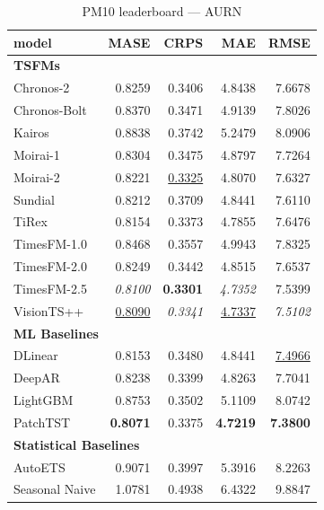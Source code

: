 \begin{table}[H]
\caption{PM10 leaderboard --- AURN}
\centering
\begin{small}
\begin{tabular}{lrrrr}
\toprule
model & MASE & CRPS & MAE & RMSE \\
\midrule
\multicolumn{5}{l}{\textbf{TSFMs}} \\
Chronos-2 & 0.8259 & 0.3406 & 4.8438 & 7.6678 \\
Chronos-Bolt & 0.8370 & 0.3471 & 4.9139 & 7.8026 \\
Kairos & 0.8838 & 0.3742 & 5.2479 & 8.0906 \\
Moirai-1 & 0.8304 & 0.3475 & 4.8797 & 7.7264 \\
Moirai-2 & 0.8221 & \underline{0.3325} & 4.8070 & 7.6327 \\
Sundial & 0.8212 & 0.3709 & 4.8441 & 7.6110 \\
TiRex & 0.8154 & 0.3373 & 4.7855 & 7.6476 \\
TimesFM-1.0 & 0.8468 & 0.3557 & 4.9943 & 7.8325 \\
TimesFM-2.0 & 0.8249 & 0.3442 & 4.8515 & 7.6537 \\
TimesFM-2.5 & \textit{0.8100} & \textbf{0.3301} & \textit{4.7352} & 7.5399 \\
VisionTS++ & \underline{0.8090} & \textit{0.3341} & \underline{4.7337} & \textit{7.5102} \\
\midrule
\multicolumn{5}{l}{\textbf{ML Baselines}} \\
DLinear & 0.8153 & 0.3480 & 4.8441 & \underline{7.4966} \\
DeepAR & 0.8238 & 0.3399 & 4.8263 & 7.7041 \\
LightGBM & 0.8753 & 0.3502 & 5.1109 & 8.0742 \\
PatchTST & \textbf{0.8071} & 0.3375 & \textbf{4.7219} & \textbf{7.3800} \\
\midrule
\multicolumn{5}{l}{\textbf{Statistical Baselines}} \\
AutoETS & 0.9071 & 0.3997 & 5.3916 & 8.2263 \\
Seasonal Naive & 1.0781 & 0.4938 & 6.4322 & 9.8847 \\
\bottomrule
\end{tabular}
\end{small}
\end{table}